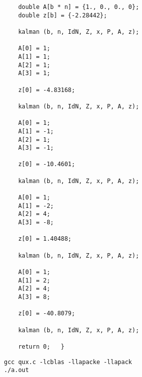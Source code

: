 \documentclass[10pt,oneside,x11names]{article}
\begin{document}
\begin{verbatim}
    double A[b * n] = {1., 0., 0., 0};
    double z[b] = {-2.28442};

    kalman (b, n, IdN, Z, x, P, A, z);

    A[0] = 1;
    A[1] = 1;
    A[2] = 1;
    A[3] = 1;

    z[0] = -4.83168;

    kalman (b, n, IdN, Z, x, P, A, z);

    A[0] = 1;
    A[1] = -1;
    A[2] = 1;
    A[3] = -1;

    z[0] = -10.4601;

    kalman (b, n, IdN, Z, x, P, A, z);

    A[0] = 1;
    A[1] = -2;
    A[2] = 4;
    A[3] = -8;

    z[0] = 1.40488;

    kalman (b, n, IdN, Z, x, P, A, z);

    A[0] = 1;
    A[1] = 2;
    A[2] = 4;
    A[3] = 8;

    z[0] = -40.8079;

    kalman (b, n, IdN, Z, x, P, A, z);

    return 0;   }
\end{verbatim}

\begin{verbatim}
gcc qux.c -lcblas -llapacke -llapack
./a.out
\end{verbatim}
\end{document}
